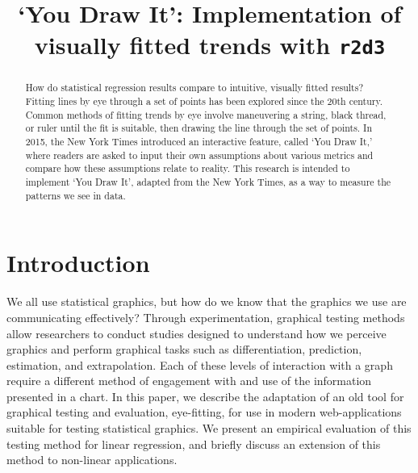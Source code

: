 \documentclass[
  letterpaper,
  DIV=11,
  numbers=noendperiod]{scrartcl}
\title{`You Draw It': Implementation of visually fitted trends with
\texttt{r2d3}}
\author{}
\date{}
\newcommand{\svp}[1]{{\textcolor{RedOrange}{#1}}}
\begin{document}
\maketitle
\begin{abstract}
How do statistical regression results compare to intuitive, visually
fitted results? Fitting lines by eye through a set of points has been
explored since the 20th century. Common methods of fitting trends by eye
involve maneuvering a string, black thread, or ruler until the fit is
suitable, then drawing the line through the set of points. In 2015, the
New York Times introduced an interactive feature, called `You Draw It,'
where readers are asked to input their own assumptions about various
metrics and compare how these assumptions relate to reality. This
research is intended to implement `You Draw It', adapted from the New
York Times, as a way to measure the patterns we see in data.
\end{abstract}
\ifdefined\Shaded\renewenvironment{Shaded}{\begin{tcolorbox}[interior hidden, breakable, borderline west={3pt}{0pt}{shadecolor}, sharp corners, enhanced, frame hidden, boxrule=0pt]}{\end{tcolorbox}}\fi

\hypertarget{introduction}{%
\section{Introduction}\label{introduction}}

We all use statistical graphics, but how do we know that the graphics we
use are communicating \svp{effectively}? Through experimentation,
graphical testing methods allow researchers to conduct studies
\svp{designed to understand how we perceive graphics and perform graphical tasks}
such as differentiation, prediction, estimation, and extrapolation.
\svp{Each of these levels of interaction with a graph require a different method of engagement with and use of the information presented in a chart.}
\svp{In this paper, we describe the adaptation of an old tool for graphical testing and evaluation, eye-fitting, for use in modern web-applications suitable for testing statistical graphics. 
We present an empirical evaluation of this testing method for linear regression, and briefly discuss an extension of this method to non-linear applications.}
\end{document}
